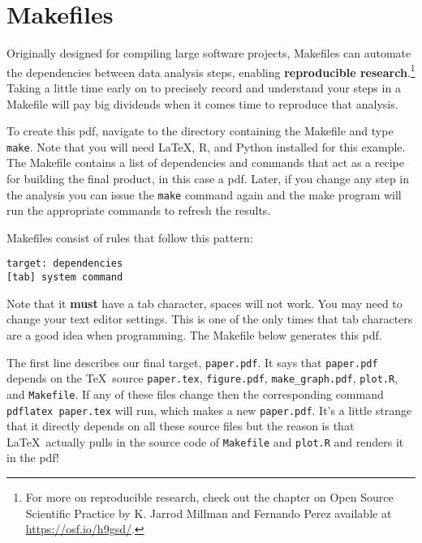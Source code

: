 \documentclass[12pt]{article}
\begin{document}
\section*{Makefiles}

Originally designed for compiling large software projects, Makefiles can automate the dependencies between data analysis steps, enabling \textbf{reproducible research}.\footnote{For more on reproducible research, check out the chapter on Open Source Scientific Practice by K. Jarrod Millman and Fernando Perez available at \url{https://osf.io/h9gsd/}.}
Taking a little time early on to precisely record and understand your steps in a Makefile will pay big dividends when it comes time to reproduce that analysis.

To create this pdf, navigate to the directory containing the Makefile and type {\tt make}. Note that you will need \LaTeX, R, and Python installed for this example. The Makefile contains a list of dependencies and commands that act as a recipe for building the final product, in this case a pdf. Later, if you change any step in the analysis you can issue the {\tt make} command again and the make program will run the appropriate commands to refresh the results.

Makefiles consist of rules that follow this pattern:

\begin{lstlisting}
target: dependencies
[tab] system command
\end{lstlisting}

Note that it \textbf{must} have a tab character, spaces will not work. You may need to change your text editor settings. This is one of the only times that tab characters are a good idea when programming. The Makefile below generates this pdf.

\vspace{0.3in}



\vspace{0.3in}

The first line describes our final target, {\tt paper.pdf}. It says that {\tt paper.pdf} depends on the \TeX\ source {\tt paper.tex}, {\tt figure.pdf}, {\tt make\_graph.pdf}, {\tt plot.R},  and {\tt Makefile}. If any of these files change then the corresponding command {\tt pdflatex paper.tex} will run, which makes a new {\tt paper.pdf}. It's a little strange that it directly depends on all these source files but the reason is that \LaTeX\ actually pulls in the source code of {\tt Makefile} and {\tt plot.R} and renders it in the pdf!
\end{document}
